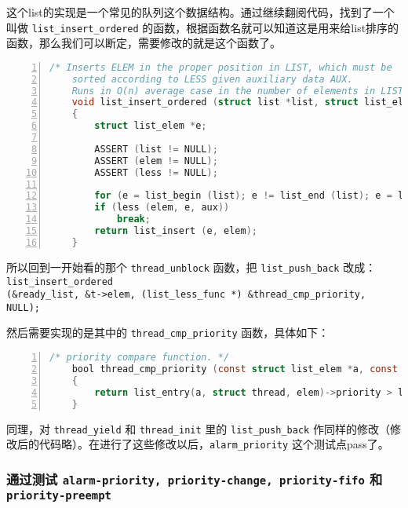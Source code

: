 \documentclass{article}
\begin{document}
	这个list的实现是一个常见的队列这个数据结构。通过继续翻阅代码，找到了一个叫做 \texttt{list\_insert\_ordered} 的函数，根据函数名就可以知道这是用来给list排序的函数，那么我们可以断定，需要修改的就是这个函数了。
	
	\begin{lstlisting}[xleftmargin = 4em,xrightmargin = 4em, aboveskip = 1em, numbers = left, language = C, title=\texttt{list\_insert\_ordered}函数]
    /* Inserts ELEM in the proper position in LIST, which must be
    sorted according to LESS given auxiliary data AUX.
    Runs in O(n) average case in the number of elements in LIST. */
    void list_insert_ordered (struct list *list, struct list_elem *elem, list_less_func *less, void *aux)
    {
    	struct list_elem *e;
    	
    	ASSERT (list != NULL);
    	ASSERT (elem != NULL);
    	ASSERT (less != NULL);
    	
    	for (e = list_begin (list); e != list_end (list); e = list_next (e))
    	if (less (elem, e, aux))
    	    break;
    	return list_insert (e, elem);
    }
	\end{lstlisting}
	
	所以回到一开始看的那个 \texttt{thread\_unblock} 函数，把 \texttt{list\_push\_back} 改成： \texttt{list\_insert\_ordered\\ (\&ready\_list, \&t->elem, (list\_less\_func *) \&thread\_cmp\_priority, NULL);}
	
	然后需要实现的是其中的 \texttt{thread\_cmp\_priority} 函数，具体如下：
	
	\begin{lstlisting}[xleftmargin = 4em,xrightmargin = 4em, aboveskip = 1em, numbers = left, language = C, title=\texttt{thread\_cmp\_priority}函数]
    /* priority compare function. */
    bool thread_cmp_priority (const struct list_elem *a, const struct list_elem *b, void *aux UNUSED)
    {
    	return list_entry(a, struct thread, elem)->priority > list_entry(b, struct thread, elem)->priority;
    }
	\end{lstlisting}
	
	同理，对 \texttt{thread\_yield} 和 \texttt{thread\_init} 里的 \texttt{list\_push\_back} 作同样的修改（修改后的代码略）。在进行了这些修改以后，\texttt{alarm\_priority} 这个测试点pass了。
	
	\subsubsection{通过测试 \texttt{alarm-priority, priority-change, priority-fifo} 和 \texttt{priority-preempt}}
	
\end{document}
